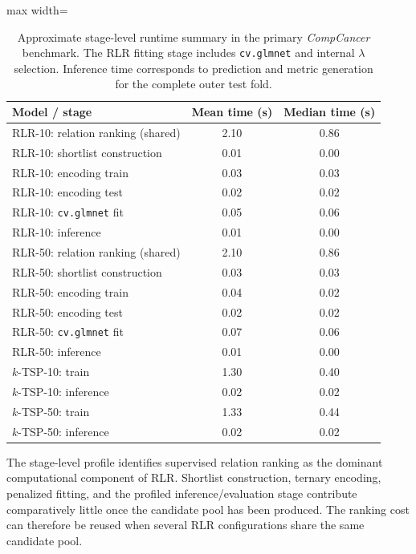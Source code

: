 \documentclass[11pt, a4paper]{article}
\newcommand{\stdtablefont}{\small}
\newcommand{\stdtablelayout}{%
  \stdtablefont
  \setlength{\tabcolsep}{4pt}
  \renewcommand{\arraystretch}{1.2}
}
\begin{document}
\begin{table}[!htbp]
\centering
\caption{Approximate stage-level runtime summary in the primary \emph{CompCancer} benchmark. The RLR fitting stage includes \texttt{cv.glmnet} and internal $\lambda$ selection. Inference time corresponds to prediction and metric generation for the complete outer test fold.}
\label{tab:runtime_stage_summary}
{\stdtablelayout
\begin{adjustbox}{max width=\linewidth}
\begin{tabular}{lcc}
\toprule
\textbf{Model / stage} &
\textbf{Mean time (s)} &
\textbf{Median time (s)} \\
\midrule
RLR-10: relation ranking (shared)   & 2.10 & 0.86 \\
RLR-10: shortlist construction    & 0.01 & 0.00 \\
RLR-10: encoding train          & 0.03 & 0.03 \\
RLR-10: encoding test           & 0.02 & 0.02 \\
RLR-10: \texttt{cv.glmnet} fit & 0.05 & 0.06 \\
RLR-10: inference               & 0.01 & 0.00 \\
\midrule
RLR-50: relation ranking (shared)   & 2.10 & 0.86 \\
RLR-50: shortlist construction    & 0.03 & 0.03 \\
RLR-50: encoding train          & 0.04 & 0.02 \\
RLR-50: encoding test           & 0.02 & 0.02 \\
RLR-50: \texttt{cv.glmnet} fit & 0.07 & 0.06 \\
RLR-50: inference               & 0.01 & 0.00 \\
\midrule
$k$-TSP-10: train               & 1.30 & 0.40 \\
$k$-TSP-10: inference           & 0.02 & 0.02 \\
$k$-TSP-50: train               & 1.33 & 0.44 \\
$k$-TSP-50: inference           & 0.02 & 0.02 \\
\bottomrule
\end{tabular}
\end{adjustbox}
}
\end{table}

The stage-level profile identifies supervised relation ranking as the dominant computational component of RLR. Shortlist construction, ternary encoding, penalized fitting, and the profiled inference/evaluation stage contribute comparatively little once the candidate pool has been produced. The ranking cost can therefore be reused when several RLR configurations share the same candidate pool.
\end{document}
